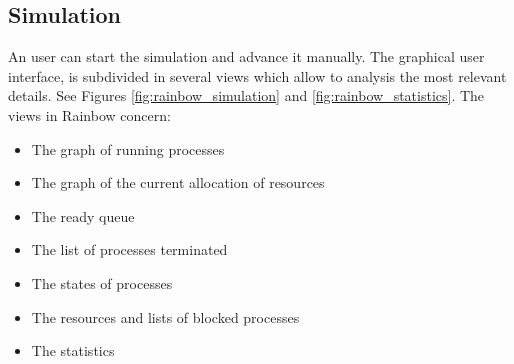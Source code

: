 \documentclass[10pt,a4paper,twoside,titlepage]{article}
\begin{document}
\subsection{Simulation}
\label{subsec:simulation}
An user can start the simulation and advance it manually. The graphical user interface, is subdivided in several views which allow to analysis the most relevant details. See Figures \ref{fig:rainbow_simulation} and \ref{fig:rainbow_statistics}. The views in Rainbow concern: 
\begin{itemize}
 \item The graph of running processes 
 \item The graph of the current allocation of resources 
 \item The ready queue
 \item The list of processes terminated 
 \item The states of processes 
 \item The resources and lists of blocked processes 
 \item The statistics 
\end{itemize}
\end{document}
